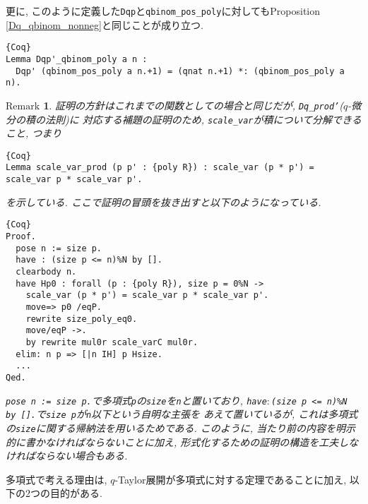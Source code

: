 \documentclass[11pt]{jsreport}
\theoremstyle{mystyle}
\newtheorem{rmk}[df]{$\textrm{Remark}$}
\newcommand{\brmk}{\begin{rmk}}
\newcommand{\ermk}{\end{rmk}}
\newcommand{\0}{\textbf{0}}
\newcommand{\1}{\textbf{1}}
\newcommand{\2}{\textbf{2}}
\begin{document}
更に, このように定義した{\tt Dqp}と{\tt qbinom\_pos\_poly}に対してもProposition \ref{Dq_qbinom_nonneg}と同じことが成り立つ. 
\begin{lstlisting}{Coq}
Lemma Dqp'_qbinom_poly a n :
  Dqp' (qbinom_pos_poly a n.+1) = (qnat n.+1) *: (qbinom_pos_poly a n).
\end{lstlisting}
\brmk
  証明の方針はこれまでの関数としての場合と同じだが, {\tt Dq\_prod'}($q$-微分の積の法則)に
  対応する補題の証明のため, {\tt scale\_var}が積について分解できること, つまり
  \begin{lstlisting}{Coq}
Lemma scale_var_prod (p p' : {poly R}) : scale_var (p * p') = scale_var p * scale_var p'. \end{lstlisting}
  を示している. ここで証明の冒頭を抜き出すと以下のようになっている. 
  \begin{lstlisting}{Coq}
Proof.
  pose n := size p.
  have : (size p <= n)%N by [].
  clearbody n.
  have Hp0 : forall (p : {poly R}), size p = 0%N ->
    scale_var (p * p') = scale_var p * scale_var p'.
    move=> p0 /eqP.
    rewrite size_poly_eq0.
    move/eqP ->.
    by rewrite mul0r scale_varC mul0r.
  elim: n p => [|n IH] p Hsize.
  ...
Qed. \end{lstlisting}
  {\tt pose n := size p.}で多項式{\tt p}の{\tt size}を{\tt n}と置いており, 
  {\tt have$\colon$(size p <= n)\%N by [].}で{\tt size p}が{\tt n}以下という自明な主張を
  あえて置いているが, これは多項式の{\tt size}に関する帰納法を用いるためである. 
  このように, 当たり前の内容を明示的に書かなければならないことに加え, 
  形式化するための証明の構造を工夫しなければならない場合もある. 
\ermk
多項式で考える理由は, $q$-Taylor展開が多項式に対する定理であることに加え, 以下の2つの目的がある. 
\end{document}
